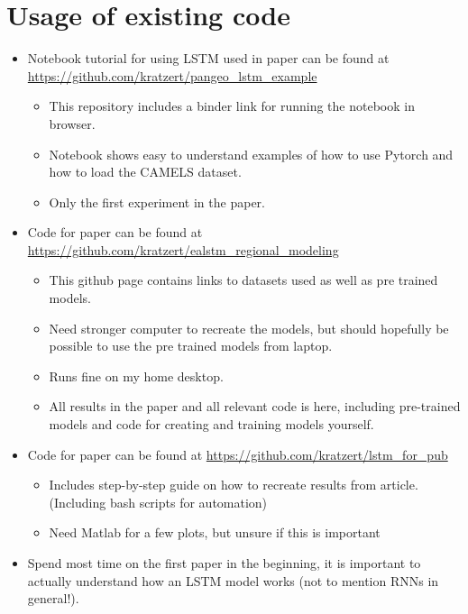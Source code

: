 \documentclass[a4paper,12pt,english]{article}
\begin{document}
\section*{Usage of existing code}
\begin{itemize}
\item Notebook tutorial for using LSTM used in paper \cite{lstm_first_paper} can be found at \url{https://github.com/kratzert/pangeo_lstm_example}
\begin{itemize}
\item This repository includes a binder link for running the notebook in browser.
\item Notebook shows easy to understand examples of how to use Pytorch and how to load the CAMELS dataset.
\item Only the first experiment in the paper.
\end{itemize}
\item Code for paper \cite{lstm_second_paper} can be found at \url{https://github.com/kratzert/ealstm_regional_modeling}
\begin{itemize}
\item This github page contains links to datasets used as well as pre trained models. 
\item Need stronger computer to recreate the models, but should hopefully be possible to use the pre trained models from laptop.
\item Runs fine on my home desktop.
\item All results in the paper and all relevant code is here, including pre-trained models and code for creating and training models yourself.
\end{itemize}
\item Code for paper \cite{lstm_third_paper} can be found at \url{https://github.com/kratzert/lstm_for_pub}
\begin{itemize}
\item Includes step-by-step guide on how to recreate results from article. (Including bash scripts for automation)
\item Need Matlab for a few plots, but unsure if this is important
\end{itemize}
\item Spend most time on the first paper in the beginning, it is important to actually understand how an LSTM model works (not to mention RNNs in general!).
\end{itemize}
\end{document}
